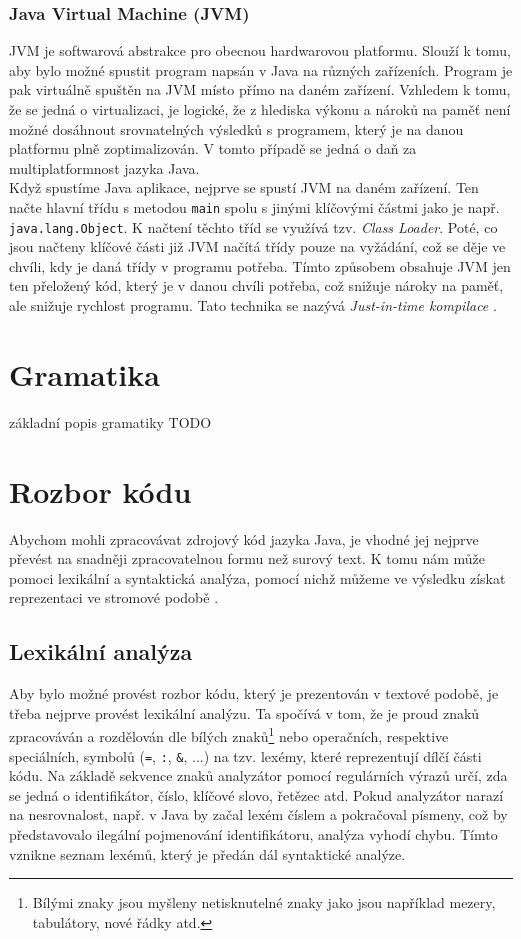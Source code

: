 			\subsubsection{Java Virtual Machine (JVM)}			
				JVM je softwarová abstrakce pro obecnou hardwarovou platformu. Slouží k tomu, aby bylo možné spustit program napsán v Java na různých zařízeních. Program je pak virtuálně spuštěn na JVM místo přímo na daném zařízení. Vzhledem k tomu, že se jedná o virtualizaci, je logické, že z hlediska výkonu a nároků na paměť není možné dosáhnout srovnatelných výsledků s programem, který je na danou platformu plně zoptimalizován. V tomto případě se jedná o daň za multiplatformnost jazyka Java.\\ 
			
			Když spustíme Java aplikace, nejprve se spustí JVM na daném zařízení. Ten načte hlavní třídu s metodou \texttt{main} spolu s jinými klíčovými částmi jako je např. \texttt{java.lang.Object}. K načtení těchto tříd se využívá tzv. \emph{Class Loader}. Poté, co jsou načteny klíčové části již JVM načítá třídy pouze na vyžádání, což se děje ve chvíli, kdy je daná třídy v programu potřeba. Tímto způsobem obsahuje JVM jen ten přeložený kód, který je v danou chvíli potřeba, což snižuje nároky na paměť, ale snižuje rychlost programu. Tato technika se nazývá \emph{Just-in-time kompilace} \cite{jit}\cite{classLoad}.
				
	
	\section{Gramatika}
		základní popis gramatiky TODO
	
	\section{Rozbor kódu}
		Abychom mohli zpracovávat zdrojový kód jazyka Java, je vhodné jej nejprve převést na snadněji zpracovatelnou formu než surový text. K tomu nám může pomoci lexikální a syntaktická analýza, pomocí nichž můžeme ve výsledku získat reprezentaci ve stromové podobě \cite{compilerTutorial}.
	
		\subsection{Lexikální analýza}
			Aby bylo možné provést rozbor kódu, který je prezentován v textové podobě, je třeba nejprve provést lexikální analýzu. Ta spočívá v tom, že je proud znaků zpracováván a rozdělován dle bílých znaků\footnote{Bílými znaky jsou myšleny netisknutelné znaky jako jsou například mezery, tabulátory, nové řádky atd.} nebo operačních, respektive speciálních, symbolů (\texttt{=}, \texttt{:}, \texttt{\&}, ...) na tzv. lexémy, které reprezentují dílčí části kódu. Na základě sekvence znaků analyzátor pomocí regulárních výrazů určí, zda se jedná o identifikátor, číslo, klíčové slovo, řetězec atd. Pokud analyzátor narazí na nesrovnalost, např. v Java by začal lexém číslem a pokračoval písmeny, což by představovalo ilegální pojmenování identifikátoru, analýza vyhodí chybu. Tímto vznikne seznam lexémů, který je předán dál syntaktické analýze.
			

